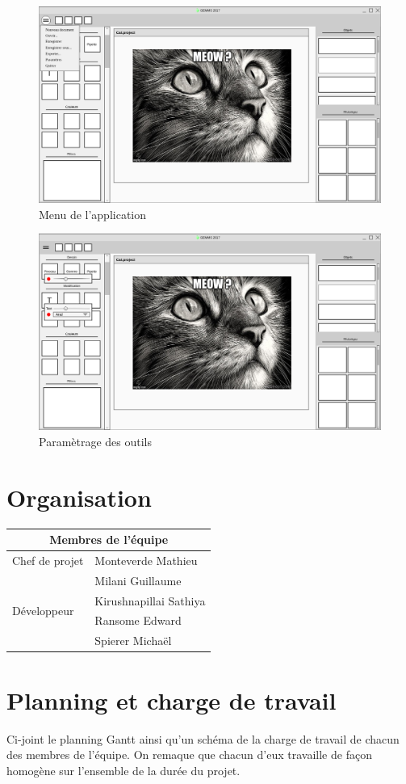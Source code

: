 \documentclass[11pt, a4paper, french]{article}
\begin{document}
		\begin{figure}[h!] 
			\centering
			\graphicspath{{Mockups/}}
			\includegraphics[scale=0.3]{menu.png}
			\caption{\label{étiquette} Menu de l'application}
		\end{figure}
	
		\begin{figure}[h!] 
			\centering
			\graphicspath{{Mockups/}}
			\includegraphics[scale=0.3]{tools_settings.png}
			\caption{\label{étiquette} Paramètrage des outils}
		\end{figure}
	
	
	\section{Organisation}
		\begin{tabular}{|l|l|}
			\hline
			\multicolumn{2}{|c|}{Membres de l'équipe} \\
			\hline
			Chef de projet &  Monteverde Mathieu \\ \hline
			\multirow{4}{*}{Développeur} 
			& Milani Guillaume \\
			& Kirushnapillai Sathiya \\
			& Ransome Edward \\
			& Spierer Michaël \\ \hline
		\end{tabular}
	
	\section{Planning et charge de travail}
	Ci-joint le planning Gantt ainsi qu'un schéma de la charge de travail de chacun des membres de l'équipe. On remaque que chacun d'eux travaille de façon homogène sur l'ensemble de la durée du projet.
	
\end{document}
